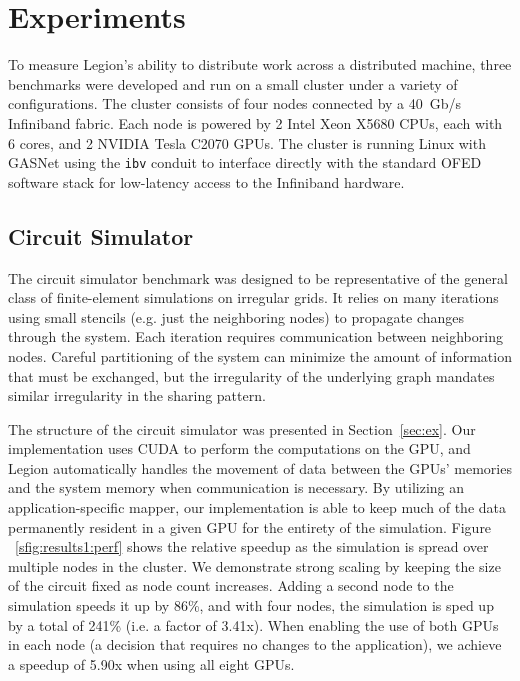 \section{Experiments}
\label{sec:exp}

To measure Legion's ability to distribute work across a distributed machine, 
three benchmarks were developed and run on a small cluster under a variety
of configurations.  The cluster consists of four nodes connected by a 40~Gb/s
Infiniband fabric.  Each node is powered by 2 Intel Xeon X5680 CPUs, each
with 6 cores, and 2 NVIDIA Tesla C2070 GPUs.  The cluster is running Linux
with GASNet using the {\tt ibv} conduit to interface directly with the standard
OFED software stack for low-latency access to the Infiniband hardware.


\subsection{Circuit Simulator}

The circuit simulator benchmark was designed to be representative of the
general class of finite-element simulations on irregular grids.  It relies
on many iterations using small stencils (e.g. just the neighboring nodes) to
propagate changes through the system.  Each iteration requires communication
between neighboring nodes.  Careful partitioning of the system can minimize
the amount of information that must be exchanged, but the irregularity of the
underlying graph mandates similar irregularity in the sharing pattern.

The structure of the circuit simulator was presented in Section~\ref{sec:ex}.
Our implementation uses CUDA to perform the computations on the GPU, and Legion
automatically handles the movement of data between the GPUs' memories and the
system memory when communication is necessary.  By utilizing an  
application-specific mapper, our implementation is able to keep much of
the data permanently resident in a given GPU for the entirety of the simulation.
Figure ~\ref{sfig:results1:perf} shows the relative speedup as the simulation is
spread over multiple nodes in the cluster.  We demonstrate strong scaling by
keeping the size of the circuit fixed as node count increases.
Adding a second node to the simulation
speeds it up by 86\%, and with four nodes, the simulation is sped up by a total
of 241\% (i.e. a factor of 3.41x).  When enabling the use of both GPUs in each
node (a decision that requires no changes to the application), we achieve
a speedup of 5.90x when using all eight GPUs.

